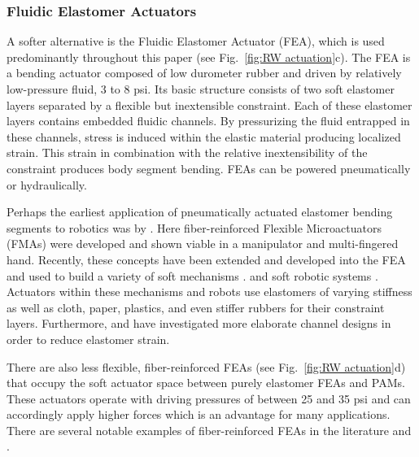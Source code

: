 \subsubsection{Fluidic Elastomer Actuators}
\label{subsubsec:RW FEA}
A softer alternative is the Fluidic Elastomer Actuator (FEA), which is used predominantly throughout this paper (see Fig.~\ref{fig:RW actuation}c).
The FEA is a bending actuator composed of low durometer rubber and driven by relatively low-pressure fluid, 3 to 8 psi.
Its basic structure consists of two soft elastomer layers separated by a flexible but inextensible constraint.
Each of these elastomer layers contains embedded fluidic channels.
By pressurizing the fluid entrapped in these channels, stress is induced within the elastic material producing localized strain. This strain in combination with the relative inextensibility of the constraint produces body segment bending.
FEAs can be powered pneumatically or hydraulically.

Perhaps the earliest application of pneumatically actuated elastomer bending segments to robotics was by \citet{suzumori1992applying}.
Here fiber-reinforced Flexible Microactuators (FMAs) were developed and shown viable in a manipulator and multi-fingered hand.
Recently, these concepts have been extended and developed into the FEA and used to build a variety of soft mechanisms  \citep{shepherd2011multigait, ilievski2011soft, morin2012camouflage, martinez2013robotic, marchese2014autonomous, marchese2014design, marchese2014whole, katzschmann2014hydraulic, tolley2014untethered, katzschmann2015autonomous, marchese2015design, marchese2015control, marchese2015dynamics}.
and soft robotic systems
\citep{onal2011soft, marchese2011soft, onal2013autonomous, marchese2014autonomous, marchese2014design, marchese2014whole, katzschmann2014hydraulic, tolley2014untethered, tolley2014resilient, katzschmann2015autonomous, marchese2015design, marchese2015control, marchese2015dynamics}.
Actuators within these mechanisms and robots use elastomers of varying stiffness as well as cloth, paper, plastics, and even stiffer rubbers for their constraint layers.
Furthermore, \citet{polygerinos2013towards} and \citet{mosadegh2014pneumatic} have investigated more elaborate channel designs in order to reduce elastomer strain.

There are also less flexible, fiber-reinforced FEAs (see Fig.~\ref{fig:RW actuation}d) that occupy the soft actuator space between purely elastomer FEAs and PAMs.
These actuators operate with driving pressures of between 25 and 35 psi and can accordingly apply higher forces which is an advantage for many applications.
There are several notable examples of fiber-reinforced FEAs in the literature \citet{suzumori1992applying, suzumori2007bending, bishop2012design, galloway2013mechanically, deimel2013compliant, deimel2014novel} and \citet{park2014design}.

